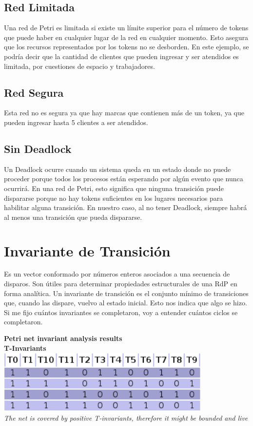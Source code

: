 \documentclass[12pt]{article}
\begin{document}
\subsection{Red Limitada}
Una red de Petri es limitada si existe un límite superior para el número de tokens que puede haber en cualquier lugar de la red en cualquier momento. Esto asegura que los recursos representados por los tokens no se desborden. 
En este ejemplo, se podría decir que la cantidad de clientes que pueden ingresar y ser atendidos es limitada, por cuestiones de espacio y trabajadores.

\subsection{Red Segura}
Esta red no es segura ya que hay marcas que contienen más de un token, ya que pueden ingresar hasta 5 clientes a ser atendidos.

\subsection{Sin Deadlock}
Un Deadlock ocurre cuando un sistema queda en un estado donde no puede proceder porque todos los procesos están esperando por algún evento que nunca ocurrirá. En una red de Petri, esto significa que ninguna transición puede dispararse porque no hay tokens suficientes en los lugares necesarios para habilitar alguna transición.
En nuestro caso, al no tener Deadlock, siempre habrá al menos una transición que pueda dispararse.

\section{Invariante de Transición}
Es un vector conformado por números enteros asociados a una secuencia de disparos. Son útiles para determinar propiedades estructurales de una RdP en forma analítica. Un invariante de transición es el conjunto mínimo de transiciones que, cuando las dispare, vuelvo al estado inicial. Esto nos indica que algo se hizo. Si me fijo cuántos invariantes se completaron, voy a entender cuántos ciclos se completaron.

\begin{center}
    \textbf{Petri net invariant analysis results}\\
    \textbf{T-Invariants}\\
    \includegraphics[width=0.8\textwidth]{T-invariants.png}\\
    \textit{The net is covered by positive T-invariants, therefore it might be bounded and live}
\end{center}
\end{document}
